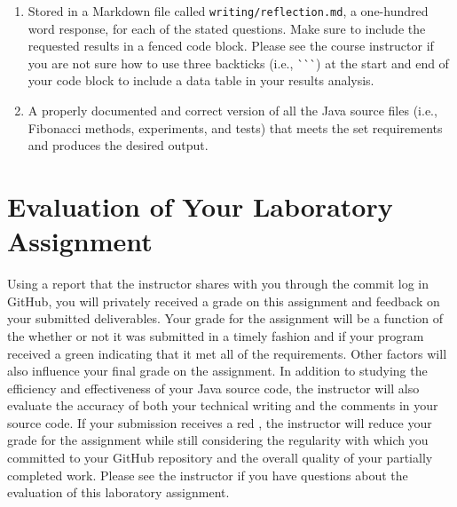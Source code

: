 \documentclass[11pt]{article}
\newcommand{\reflection}{\lstinline{writing/reflection.md}}
\newcommand{\backticktrick}{\`{}\`{}\`{}}
\newcommand{\checkmark}{\ding{51}}
\newcommand{\naughtmark}{\ding{55}}
\begin{document}
\begin{enumerate}

  \setlength{\itemsep}{0in}

\item Stored in a Markdown file called \reflection{}, a one-hundred word
  response, for each of the stated questions. Make sure to include the requested
  results in a fenced code block. Please see the course instructor if you are
  not sure how to use three backticks (i.e., \backticktrick{}) at the start and
  end of your code block to include a data table in your results analysis.

\item A properly documented and correct version of all the Java source files
  (i.e., Fibonacci methods, experiments, and tests) that meets the set
  requirements and produces the desired output.

\end{enumerate}

\section*{Evaluation of Your Laboratory Assignment}

Using a report that the instructor shares with you through the commit log in
GitHub, you will privately received a grade on this assignment and feedback on
your submitted deliverables. Your grade for the assignment will be a function of
the whether or not it was submitted in a timely fashion and if your program
received a green \checkmark{} indicating that it met all of the requirements.
Other factors will also influence your final grade on the assignment. In
addition to studying the efficiency and effectiveness of your Java source code,
the instructor will also evaluate the accuracy of both your technical writing
and the comments in your source code. If your submission receives a red
\naughtmark{}, the instructor will reduce your grade for the assignment while
still considering the regularity with which you committed to your GitHub
repository and the overall quality of your partially completed work. Please see
the instructor if you have questions about the evaluation of this laboratory
assignment.
\end{document}
